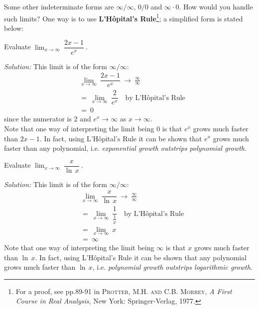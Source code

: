Some other indeterminate forms are $\infty/\infty$, $0/0$ and $\infty \cdot 0$.
How would you handle such limits? One way is to use
\textbf{L'H\^{o}pital's Rule}\footnote{For a proof,
see pp.89-91 in \textsc{Protter, M.H. and C.B. Morrey}, \emph{A First Course in
Real Analysis}, New York: Springer-Verlag, 1977.}; a simplified form is stated
below:


\begin{exmp}\label{exmp:limxexpx}
\noindent Evaluate $\displaystyle\lim_{x \to \infty}~\dfrac{2x - 1}{e^x}~$.\vspace{1mm}
\par\noindent\emph{Solution:} This limit is of the form $\infty/\infty$:
\begin{align*}
&\lim_{x \to \infty}~\dfrac{2x - 1}{e^x} ~\to~ \frac{\infty}{\infty}\\
&=~ \lim_{x \to \infty}~\dfrac{2}{e^x} \quad\text{by L'H\^{o}pital's Rule}\\
&=~ 0
\end{align*}
since the numerator is $2$ and $e^x \to \infty$ as $x \to \infty$.\\
Note that one way of interpreting the limit being $0$ is that $e^x$ grows much
faster than $2x - 1$. In fact, using L'H\^{o}pital's Rule it can be shown that
$e^x$ grows much faster than any polynomial, i.e. \emph{exponential growth
outstrips polynomial growth}.
\end{exmp}
\divider
\newpage
\begin{exmp}\label{exmp:limxlnx}
\noindent Evaluate $\displaystyle\lim_{x \to \infty}~\dfrac{x}{\ln\,x}~$.\vspace{1mm}
\par\noindent\emph{Solution:} This limit is of the form $\infty/\infty$:
\begin{align*}
&\lim_{x \to \infty}~\dfrac{x}{\ln\,x} ~\to~ \frac{\infty}{\infty}\\
&=~ \lim_{x \to \infty}~\dfrac{1}{\frac{1}{x}} \quad\text{by L'H\^{o}pital's Rule}\\[6pt]
&=~ \lim_{x \to \infty}~x\\
&=~ \infty
\end{align*}
Note that one way of interpreting the limit being $\infty$ is that $x$ grows
much faster than $\ln\,x$. In fact, using L'H\^{o}pital's Rule it can be shown
that any polynomial grows much faster than $\ln\,x$, i.e. \emph{polynomial
growth outstrips logarithmic growth}.
\end{exmp}
